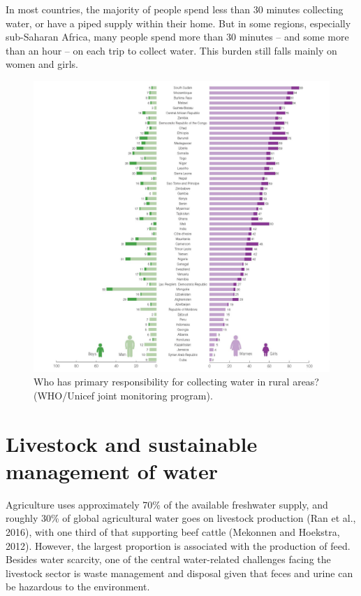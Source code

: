 \documentclass[]{book}
\begin{document}
In most countries, the majority of people spend less than 30 minutes
collecting water, or have a piped supply within their home. But in some
regions, especially sub-Saharan Africa, many people spend more than 30
minutes -- and some more than an hour -- on each trip to collect water.
This burden still falls mainly on women and girls.

\begin{figure}

{\centering \includegraphics[width=1\linewidth]{figures/1512} 

}

\caption{Who has primary responsibility for collecting water in rural areas? (WHO/Unicef joint monitoring program).}\label{fig:water-girl}
\end{figure}

\section{Livestock and sustainable management of
water}\label{livestock-and-sustainable-management-of-water}

Agriculture uses approximately 70\% of the available freshwater supply,
and roughly 30\% of global agricultural water goes on livestock
production (Ran et al., 2016), with one third of that supporting beef
cattle (Mekonnen and Hoekstra, 2012). However, the largest proportion is
associated with the production of feed. Besides water scarcity, one of
the central water-related challenges facing the livestock sector is
waste management and disposal given that feces and urine can be
hazardous to the environment.
\end{document}
